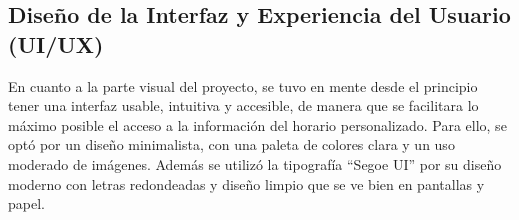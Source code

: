 \subsection{Diseño de la Interfaz y Experiencia del Usuario (UI/UX)}

En cuanto a la parte visual del proyecto, se tuvo en mente desde el principio tener una interfaz usable, intuitiva y accesible, de manera que se facilitara lo máximo posible el acceso a la información del horario personalizado.
\newline\newline
Para ello, se optó por un diseño minimalista, con una paleta de colores clara y un uso moderado de imágenes. Además se utilizó la tipografía ``Segoe UI'' por su diseño moderno con letras redondeadas y diseño limpio que se ve bien en pantallas y papel.
\newline
